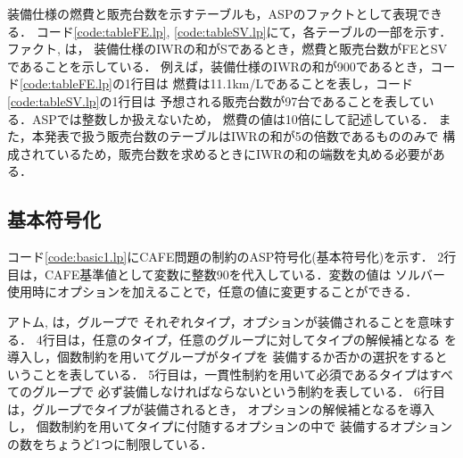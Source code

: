 装備仕様の燃費と販売台数を示すテーブルも，ASPのファクトとして表現できる．
コード\ref{code:tableFE.lp}, \ref{code:tableSV.lp}にて，各テーブルの一部を示す．
ファクト, は，
装備仕様のIWRの和がSであるとき，燃費と販売台数がFEとSVであることを示している．
例えば，装備仕様のIWRの和が900であるとき，コード\ref{code:tableFE.lp}の1行目は
燃費は11.1km/Lであることを表し，コード\ref{code:tableSV.lp}の1行目は
予想される販売台数が97台であることを表している．ASPでは整数しか扱えないため，
燃費の値は10倍にして記述している．
また，本発表で扱う販売台数のテーブルはIWRの和が5の倍数であるもののみで
構成されているため，販売台数を求めるときにIWRの和の端数を丸める必要がある．

 

 

\subsection{基本符号化}
 

コード\ref{code:basic1.lp}にCAFE問題の制約のASP符号化(基本符号化)を示す．
2行目は，CAFE基準値として変数に整数90を代入している．変数の値は
ソルバー使用時にオプションを加えることで，任意の値に変更することができる．

アトム, は，グループで
それぞれタイプ，オプションが装備されることを意味する．
%
4行目は，任意のタイプ，任意のグループに対してタイプの解候補となる
を導入し，個数制約を用いてグループがタイプを
装備するか否かの選択をするということを表している．
%
5行目は，一貫性制約を用いて必須であるタイプはすべてのグループで
必ず装備しなければならないという制約を表している．
%
6行目は，グループでタイプが装備されるとき，
オプションの解候補となるを導入し，
個数制約を用いてタイプに付随するオプションの中で
装備するオプションの数をちょうど1つに制限している．



